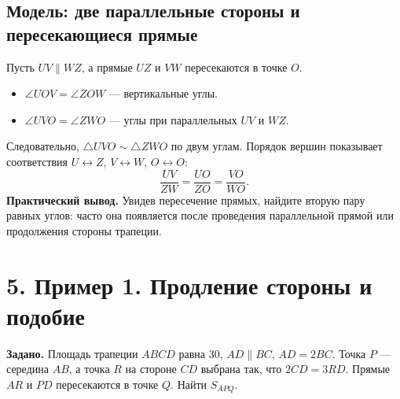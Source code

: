 \documentclass[a4paper,12pt]{article}
\newcommand{\key}[1]{\textcolor{darkaccent}{\textbf{#1}}}
\begin{document}
\subsection*{Модель: две параллельные стороны и пересекающиеся прямые}
Пусть $UV\parallel WZ$, а прямые $UZ$ и $VW$ пересекаются в точке $O$.

\begin{center}
\end{center}

\begin{itemize}
\item $\angle UOV=\angle ZOW$ --- вертикальные углы.
\item $\angle UVO=\angle ZWO$ --- углы при параллельных $UV$ и $WZ$.
\end{itemize}
Следовательно, $\triangle UVO\sim\triangle ZWO$ по двум углам. Порядок вершин показывает соответствия $U\leftrightarrow Z$, $V\leftrightarrow W$, $O\leftrightarrow O$:
\[
\boxed{\frac{UV}{ZW}=\frac{UO}{ZO}=\frac{VO}{WO}}.
\]
\key{Практический вывод.} Увидев пересечение прямых, найдите вторую пару равных углов: часто она появляется после проведения параллельной прямой или продолжения стороны трапеции.
\clearpage

\section*{5. Пример 1. Продление стороны и подобие}
\textbf{Задано.} Площадь трапеции $ABCD$ равна $30$, $AD\parallel BC$, $AD=2BC$. Точка $P$ --- середина $AB$, а точка $R$ на стороне $CD$ выбрана так, что $2CD=3RD$. Прямые $AR$ и $PD$ пересекаются в точке $Q$. Найти $S_{APQ}$.

\begin{center}
\end{center}
\end{document}
